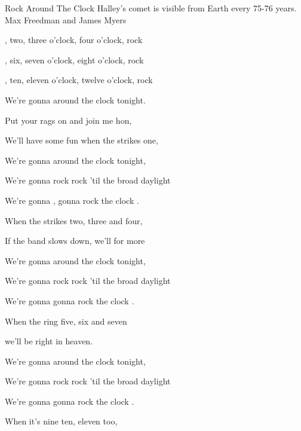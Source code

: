 \begin{SBSong}{Rock Around The Clock}
  {Halley's comet is visible from Earth every 75-76 years.}
  {Max Freedman and James Myers}
  \begin{SBVerse}
    , two, three o'clock, four o'clock, rock

    , six, seven o'clock, eight o'clock, rock

    , ten, eleven o'clock, twelve o'clock, rock

    We're gonna  around the clock tonight.
  \end{SBVerse}  
  \begin{SBVerse}  
    Put your  rags on and join me hon,
    
    We'll have some fun when the  strikes one,
    
    We're gonna  around the clock tonight,
    
    We're gonna  rock rock 'til the broad daylight
    
    We're gonna , gonna rock  the clock .
  \end{SBVerse}  
  \begin{SBVerse} 
    When the  strikes two, three and four,
    
    If the band slows down, we'll  for more
    
    We're gonna  around the clock tonight,
    
    We're gonna  rock rock 'til the broad daylight
    
    We're gonna  gonna rock  the clock .

  \end{SBVerse}  
  \begin{SBVerse}  
    When the  ring five, six and seven
    
    we'll be right in  heaven.
    
    We're gonna  around the clock tonight,
    
    We're gonna  rock rock 'til the broad daylight
    
    We're gonna  gonna rock  the clock .
  \end{SBVerse}  
  \CBPageBrk
  \begin{SBVerse}  
    When it's  nine ten, eleven too,
    

\end{SBVerse}
\end{SBSong}
